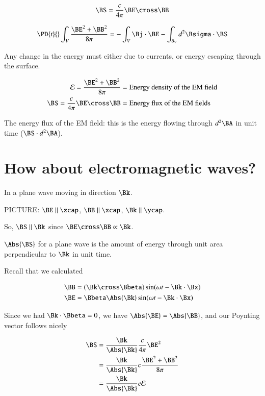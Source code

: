 \begin{equation}\label{eqn:relativisticElectrodynamicsL17:30}
\BS = \frac{c}{4 \pi} \BE \cross \BB
\end{equation}

\begin{equation}\label{eqn:relativisticElectrodynamicsL17:50}
\PD{t}{} \int_V \frac{\BE^2 + \BB^2 }{8 \pi} = - \int_V \Bj \cdot \BE - \int_{\partial_V} d^2 \Bsigma \cdot \BS
\end{equation}

Any change in the energy must either due to currents, or energy escaping through the surface.

\begin{align}\label{eqn:relativisticElectrodynamicsL17:70}
\mathcal{E} = \frac{\BE^2 + \BB^2 }{8 \pi} &= \mbox{Energy density of the EM field} \\
\BS = \frac{c}{4 \pi} \BE \cross \BB &= \mbox{Energy flux of the EM fields}
\end{align}

The energy flux of the EM field: this is the energy flowing through $d^2 \BA$ in unit time ($\BS \cdot d^2 \BA$).

\section{How about electromagnetic waves?}

In a plane wave moving in direction $\Bk$. 

PICTURE: $\BE \parallel \zcap$, $\BB \parallel \xcap$, $\Bk \parallel \ycap$.

So, $\BS \parallel \Bk$ since $\BE \cross \BB \propto \Bk$.

$\Abs{\BS}$ for a plane wave is the amount of energy through unit area perpendicular to $\Bk$ in unit time.

Recall that we calculated

\begin{align}\label{eqn:relativisticElectrodynamicsL17:90}
\BB &= (\Bk \cross \Bbeta) \sin(\omega t - \Bk \cdot \Bx) \\
\BE &= \Bbeta \Abs{\Bk} \sin(\omega t - \Bk \cdot \Bx)
\end{align}

Since we had $\Bk \cdot \Bbeta = 0$, we have $\Abs{\BE} = \Abs{\BB}$, and our Poynting vector follows nicely

\begin{align*}
\BS 
&= \frac{\Bk}{\Abs{\Bk}} \frac{c}{4 \pi} \BE^2  \\
&= \frac{\Bk}{\Abs{\Bk}} c \frac{\BE^2 + \BB^2}{8 \pi} \\
&= \frac{\Bk}{\Abs{\Bk}} e \mathcal{E}
\end{align*}

